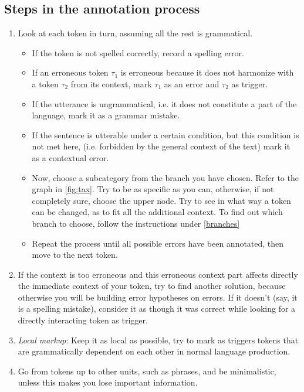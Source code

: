 \documentclass[12pt]{article}
\begin{document}
\subsection{Steps in the annotation process}
\begin{enumerate}
\item Look at each token in turn, assuming all the rest is grammatical.
\begin{itemize}
  \item If the token is not spelled correctly, record a spelling error.
  \item If an erroneous token $\tau_1$ is erroneous because it does not
  harmonize with a token $\tau_2$
  from its context,  mark $\tau_1$ as an error and $\tau_2$ as trigger.
  \item If the utterance is ungrammatical, i.e. it does not constitute a part of
  the language, mark it as a grammar mistake.
  \item If the sentence is utterable under a certain condition, but this
  condition is not met here, (i.e. forbidden by the general context of the
  text) mark it as a contextual error.
  \item Now, choose a subcategory from the branch you have chosen. Refer to the
  graph in \ref{fig:tax}.
  Try to be as specific as you can, otherwise, if not completely sure, choose
  the upper node. Try to see in what way a token can be changed, as to
  fit all the additional context. To find out which branch to choose, follow the
  instructions under \ref{branches}
  \item Repeat the process until all possible errors have been annotated, then
  move to the next token.
\end{itemize}

  \item If the context is too erroneous and this erroneous context part affects
  directly the immediate context of your token, try to find another solution,
  because otherwise you will be building error hypotheses on errors. If it doesn't
  (say, it is a spelling mistake), consider it as though it was correct while
  looking for a directly interacting token as trigger.

\item \textit{Local markup}: Keep it as local as possible, try to mark as
triggers tokens that are grammatically dependent on each other in normal
language production.

\item Go from tokens up to other units, such as phrases, and be minimalistic, unless this makes you lose important information.


\end{enumerate}
\end{document}
